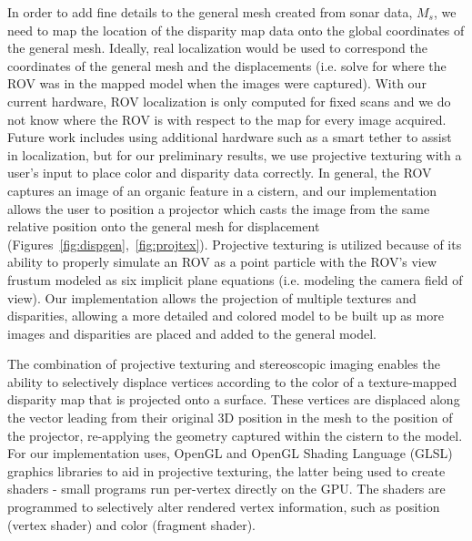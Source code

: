 \documentclass[a4paper,twoside]{article}
\begin{document}
\noindent In order to add fine details to the general mesh created from sonar data, $M_s$, we need to map the location of the disparity map data onto the global coordinates of the general mesh.  Ideally, real localization would be used to correspond the coordinates of the general mesh and the displacements (i.e. solve for where the ROV was in the mapped model when the images were captured).  With our current hardware, ROV localization is only computed for fixed scans and we do not know where the ROV is with respect to the map for every image acquired.  Future work includes using additional hardware such as a smart tether to assist in localization, but for our preliminary results, we use projective texturing with a user's input to place color and disparity data correctly. In general, the ROV captures an image of an organic feature in a cistern, and our implementation allows the user to position a projector which casts the image from the same relative position onto the general mesh for displacement (Figures~\ref{fig:dispgen},~\ref{fig:projtex}). Projective texturing is  utilized because of its ability to properly simulate an ROV as a point particle with the ROV's view frustum modeled as six implicit plane equations (i.e. modeling the camera field of view). Our implementation allows the projection of multiple textures and disparities, allowing a more detailed and colored model to be built up as more images and disparities are placed and added to the general model.  

The combination of projective texturing and stereoscopic imaging enables the ability to selectively displace vertices according to the color of a texture-mapped disparity map that is projected onto a surface. These vertices are displaced along the vector leading from their original 3D position in the mesh to the position of the projector, re-applying the geometry captured within the cistern to the model.  For our implementation uses, OpenGL and OpenGL Shading Language (GLSL) graphics libraries to aid in projective texturing, the latter being used to create shaders - small programs run per-vertex directly on the GPU. The shaders are programmed to selectively alter rendered vertex information, such as position (vertex shader) and color (fragment shader). 
\end{document}
